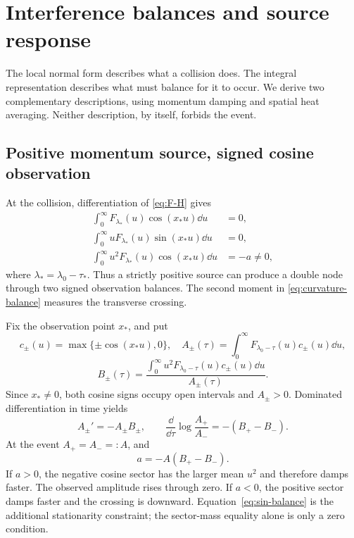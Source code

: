 \section{Interference balances and source response}\label{sec:interference}

The local normal form describes what a collision does. The integral
representation describes what must balance for it to occur. We derive
two complementary descriptions, using momentum damping and spatial
heat averaging. Neither description, by itself, forbids the event.

\subsection{Positive momentum source, signed cosine observation}
At the collision, differentiation of \eqref{eq:F-H} gives
\begin{align}
 \int_0^\infty F_{\lambda_*}(u)\cos(x_*u)\dd u&=0,\label{eq:cos-balance}\\
 \int_0^\infty uF_{\lambda_*}(u)\sin(x_*u)\dd u&=0,\label{eq:sin-balance}\\
 \int_0^\infty u^2F_{\lambda_*}(u)\cos(x_*u)\dd u&=-a\ne0,
 \label{eq:curvature-balance}
\end{align}
where \(\lambda_*=\lambda_0-\tau_*\).
Thus a strictly positive source can produce a double node through two
signed observation balances. The second moment in
\eqref{eq:curvature-balance} measures the transverse crossing.

Fix the observation point \(x_*\), and put
\[
 c_\pm(u)=\max\{\pm\cos(x_*u),0\},\quad
 A_\pm(\tau)=\int_0^\infty F_{\lambda_0-\tau}(u)c_\pm(u)\dd u,
\]
\[
 B_\pm(\tau)=
 \frac{\int_0^\infty u^2F_{\lambda_0-\tau}(u)c_\pm(u)\dd u}
      {A_\pm(\tau)}.
\]
Since \(x_*\ne0\), both cosine signs occupy open intervals and
\(A_\pm>0\). Dominated differentiation in time yields
\begin{equation}\label{eq:sector-damping}
 A_\pm'=-A_\pm B_\pm,\qquad
 \frac{\dd}{\dd\tau}\log\frac{A_+}{A_-}=-(B_+-B_-).
\end{equation}
At the event \(A_+=A_-=:A\), and
\begin{equation}\label{eq:sector-curvature}
 a=-A(B_+-B_-).
\end{equation}
If \(a>0\), the negative cosine sector has the larger mean \(u^2\)
and therefore damps faster. The observed amplitude rises through zero.
If \(a<0\), the positive sector damps faster and the crossing is downward.
Equation~\eqref{eq:sin-balance} is the additional stationarity constraint;
the sector-mass equality alone is only a zero condition.


